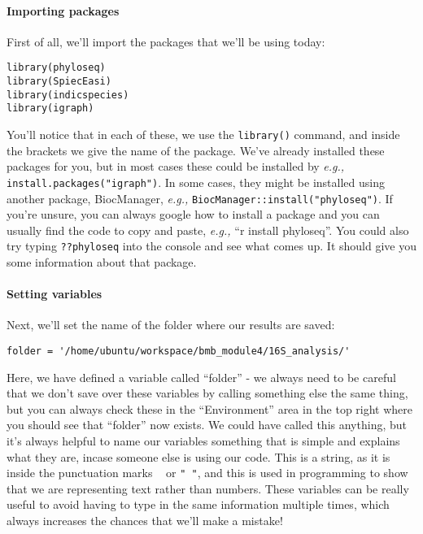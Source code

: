 \documentclass[
]{book}
\begin{document}
\paragraph{Importing packages}\label{importing-packages-1}

First of all, we'll import the packages that we'll be using today:

\begin{verbatim}
library(phyloseq)
library(SpiecEasi)
library(indicspecies)
library(igraph)
\end{verbatim}

You'll notice that in each of these, we use the \texttt{library()} command, and inside the brackets we give the name of the package. We've already installed these packages for you, but in most cases these could be installed by \emph{e.g.,} \texttt{install.packages("igraph")}. In some cases, they might be installed using another package, BiocManager, \emph{e.g.,} \texttt{BiocManager::install("phyloseq")}. If you're unsure, you can always google how to install a package and you can usually find the code to copy and paste, \emph{e.g.,} ``r install phyloseq''. You could also try typing \texttt{??phyloseq} into the console and see what comes up. It should give you some information about that package.

\paragraph{Setting variables}\label{setting-variables-1}

Next, we'll set the name of the folder where our results are saved:

\begin{verbatim}
folder = '/home/ubuntu/workspace/bmb_module4/16S_analysis/'
\end{verbatim}

Here, we have defined a variable called ``folder'' - we always need to be careful that we don't save over these variables by calling something else the same thing, but you can always check these in the ``Environment'' area in the top right where you should see that ``folder'' now exists. We could have called this anything, but it's always helpful to name our variables something that is simple and explains what they are, incase someone else is using our code. This is a string, as it is inside the punctuation marks \texttt{\textquotesingle{}\ \textquotesingle{}} or \texttt{"\ "}, and this is used in programming to show that we are representing text rather than numbers. These variables can be really useful to avoid having to type in the same information multiple times, which always increases the chances that we'll make a mistake!
\end{document}
